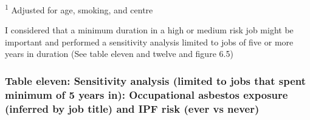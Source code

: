 \documentclass[
]{article}
\begin{document}
\textsuperscript{1} Adjusted for age, smoking, and centre

I considered that a minimum duration in a high or medium risk job might
be important and performed a sensitivity analysis limited to jobs of
five or more years in duration (See table eleven and twelve and figure
6.5)

\newpage

\hypertarget{table-eleven-sensitivity-analysis-limited-to-jobs-that-spent-minimum-of-5-years-in-occupational-asbestos-exposure-inferred-by-job-title-and-ipf-risk-ever-vs-never}{%
\subsubsection{Table eleven: Sensitivity analysis (limited to jobs that
spent minimum of 5 years in): Occupational asbestos exposure (inferred
by job title) and IPF risk (ever vs
never)}\label{table-eleven-sensitivity-analysis-limited-to-jobs-that-spent-minimum-of-5-years-in-occupational-asbestos-exposure-inferred-by-job-title-and-ipf-risk-ever-vs-never}}
\end{document}
